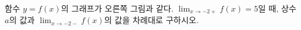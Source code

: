 \noindent\begin{minipage}[t]{0.58\linewidth}\vspace{0pt}\raggedright 함수 $y=f(x)$의 그래프가 오른쪽 그림과 같다. $\displaystyle\lim_{x\to-2+} f(x)=5$일 때, 상수 $a$의 값과 $\displaystyle\lim_{x\to-2-} f(x)$의 값을 차례대로 구하시오.\end{minipage}\hfill\begin{minipage}[t]{0.4\linewidth}\vspace{0pt}\centering \resizebox{\ifdim\width>\linewidth\linewidth\else\width\fi}{!}{}\end{minipage}\par
